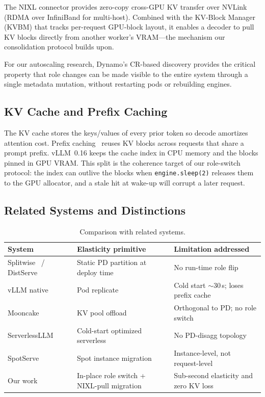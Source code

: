 \documentclass[10pt,twocolumn,letterpaper]{article}
\begin{document}
The NIXL connector provides zero-copy cross-GPU KV transfer over NVLink (RDMA over InfiniBand for multi-host). Combined with the KV-Block Manager (KVBM) that tracks per-request GPU-block layout, it enables a decoder to pull KV blocks directly from another worker's VRAM---the mechanism our consolidation protocol builds upon.

For our autoscaling research, Dynamo's CR-based discovery provides the critical property that role changes can be made visible to the entire system through a single metadata mutation, without restarting pods or rebuilding engines.


\subsection{KV Cache and Prefix Caching}
\label{sec:kv-cache}

The KV cache stores the keys/values of every prior token so decode amortizes attention cost. Prefix caching~\cite{lmcache} reuses KV blocks across requests that share a prompt prefix. vLLM~0.16 keeps the cache index in CPU memory and the blocks pinned in GPU VRAM. This split is the coherence target of our role-switch protocol: the index can outlive the blocks when \texttt{engine.sleep(2)} releases them to the GPU allocator, and a stale hit at wake-up will corrupt a later request.


\subsection{Related Systems and Distinctions}
\label{sec:related}

\begin{table}[t]
\centering
\caption{Comparison with related systems.}
\label{tab:related}
\small
\begin{tabularx}{\linewidth}{@{}lLL@{}}
\toprule
System & Elasticity primitive & Limitation addressed \\
\midrule
Splitwise~\cite{splitwise} / DistServe~\cite{distserve} & Static PD partition at deploy time & No run-time role flip \\
vLLM native~\cite{vllm} & Pod replicate & Cold start ${\sim}$30\,s; loses prefix cache \\
Mooncake~\cite{mooncake} & KV pool offload & Orthogonal to PD; no role switch \\
ServerlessLLM~\cite{serverlessllm} & Cold-start optimized serverless & No PD-disagg topology \\
SpotServe~\cite{spotserve} & Spot instance migration & Instance-level, not request-level \\
Our work & In-place role switch + NIXL-pull migration & Sub-second elasticity and zero KV loss \\
\bottomrule
\end{tabularx}
\end{table}
\end{document}
